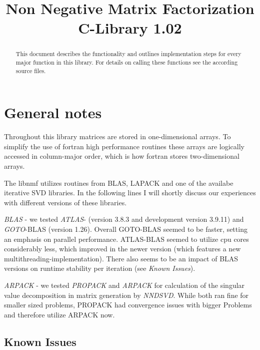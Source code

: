 \documentclass[a4paper,10pt]{scrartcl}
\title{Non Negative Matrix Factorization C-Library 1.02}
\begin{document}
\fancyhead{}


\maketitle


	\begin{abstract}
		This document describes the functionality and outlines implementation steps for every major function
		in this	library. For details on calling these functions see the according source files.
	\end{abstract}

\tableofcontents
\pagebreak

	\section{General notes}

	Throughout this library matrices are stored in one-dimensional arrays. To simplify the use of fortran high performance
	routines these arrays are logically accessed in column-major order, which is how fortran stores 
	two-dimensional arrays.\newline

	The libnmf utilizes routines from BLAS, LAPACK and one of the availabe iterative SVD libraries. In the following lines
	I will shortly discuss our experiences with different versions of these libraries.

	\emph{BLAS} - we tested \emph{ATLAS}- (version 3.8.3 and development version 3.9.11) and \emph{GOTO}-BLAS (version 1.26). Overall GOTO-BLAS seemed to be faster,
	setting an emphasis on parallel performance. ATLAS-BLAS seemed to utilize cpu cores considerably less, which improved in
	the newer version (which features a new multithreading-implementation). There also seems to be an impact of BLAS versions on runtime stability
	per iteration (see \emph{Known Issues}).

	\emph{ARPACK} - we tested \emph{PROPACK} and \emph{ARPACK} for calculation of the singular value decomposition in
	matrix generation by \emph{NNDSVD}. While both ran fine for smaller sized problems, PROPACK had convergence issues
	with bigger Problems and therefore utilize ARPACK now.

	\subsection{Known Issues}
\end{document}
